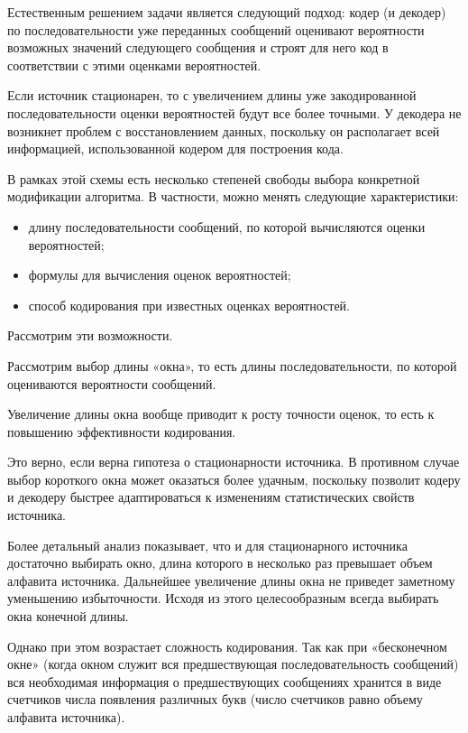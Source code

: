 \documentclass[14pt]{article}
\begin{document}
Естественным решением задачи является следующий подход: кодер (и декодер) по последовательности уже переданных сообщений оценивают вероятности возможных значений следующего сообщения и строят для него код в соответствии с этими оценками вероятностей.

Если источник стационарен, то с увеличением длины уже закодированной последовательности оценки вероятностей будут все более точными. У декодера не возникнет проблем с восстановлением данных, поскольку он располагает всей информацией, использованной кодером для построения кода.

В рамках этой схемы есть несколько степеней свободы выбора конкретной модификации алгоритма. В частности, можно менять следующие характеристики:

\begin{itemize}
    \item длину последовательности сообщений, по которой вычисляются оценки вероятностей;
    \item формулы для вычисления оценок вероятностей;
    \item способ кодирования при известных оценках вероятностей.
\end{itemize}

Рассмотрим эти возможности.

Рассмотрим выбор длины «окна», то есть длины последовательности, по которой оцениваются вероятности сообщений.

Увеличение длины окна вообще приводит к росту точности оценок, то есть к повышению эффективности кодирования.

Это верно, если верна гипотеза о стационарности источника. В противном случае выбор короткого окна может оказаться более удачным, поскольку позволит кодеру и декодеру быстрее адаптироваться к изменениям статистических свойств источника.

Более детальный анализ показывает, что и для стационарного источника достаточно выбирать окно, длина которого в несколько раз превышает объем алфавита источника. Дальнейшее увеличение длины окна не приведет заметному уменьшению избыточности. Исходя из этого целесообразным всегда выбирать окна конечной длины.

Однако при этом возрастает сложность кодирования. Так как при «бесконечном окне» (когда окном служит вся предшествующая последовательность сообщений) вся необходимая информация о предшествующих сообщениях хранится в виде счетчиков числа появления различных букв (число счетчиков равно объему алфавита источника).
\end{document}
